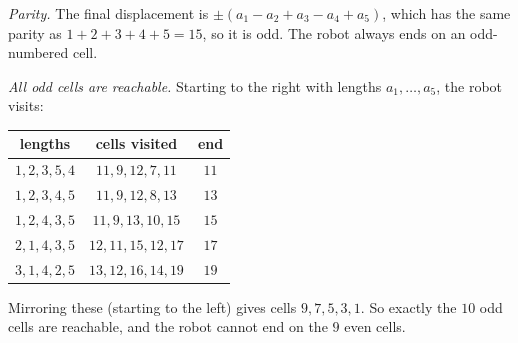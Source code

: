 \emph{Parity.} The final displacement is $\pm(a_1-a_2+a_3-a_4+a_5)$, which has the same parity as $1+2+3+4+5=15$, so it is odd. The robot always ends on an odd-numbered cell.

\emph{All odd cells are reachable.} Starting to the right with lengths $a_1,\dots,a_5$, the robot visits:
\begin{center}
\begin{tabular}{ccc}
lengths & cells visited & end\\\hline
$1,2,3,5,4$ & $11,9,12,7,11$ & $11$\\
$1,2,3,4,5$ & $11,9,12,8,13$ & $13$\\
$1,2,4,3,5$ & $11,9,13,10,15$ & $15$\\
$2,1,4,3,5$ & $12,11,15,12,17$ & $17$\\
$3,1,4,2,5$ & $13,12,16,14,19$ & $19$
\end{tabular}
\end{center}
Mirroring these (starting to the left) gives cells $9,7,5,3,1$. So exactly the $10$ odd cells are reachable, and the robot cannot end on the $\boxed{9}$ even cells.
